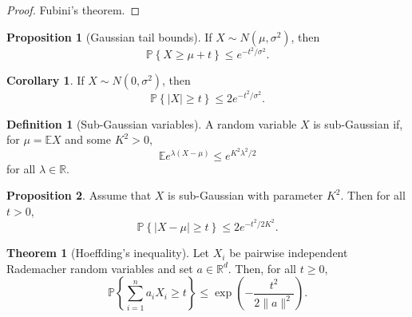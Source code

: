 \documentclass{article}
\theoremstyle{definition}
\newtheorem{theorem}{Theorem}[section]
\newtheorem{definition}{Definition}[section]
\newtheorem{proposition}{Proposition}[section]
\newtheorem{corollary}{Corollary}[section]
\begin{document}
  \begin{proof}
    Fubini's theorem.
  \end{proof}

  \begin{proposition}[Gaussian tail bounds]
    If \( X \sim N(\mu, \sigma^{2}) \), then
    \[
      \mathbb{P}\left\{ X \geq \mu + t \right\} \leq e^{-t^{2} / \sigma^{2}}.
    \]
  \end{proposition}

  \begin{corollary}
    If \( X \sim N(0, \sigma^{2}) \), then
    \[
      \mathbb{P}\left\{ \left| X \right| \geq t \right\} \leq 2
      e^{-t^{2} / \sigma^{2}}.
    \]
  \end{corollary}

  \begin{definition}[Sub-Gaussian variables]
    A random variable \( X \) is sub-Gaussian if, for \( \mu =
    \mathbb{E}X \) and some \( K^{2} > 0 \),
    \[
      \mathbb{E}e^{\lambda(X - \mu)} \leq e^{K^{2} \lambda^{2} / 2}
    \]
    for all \( \lambda \in \mathbb{R} \).
  \end{definition}

  \begin{proposition}
    Assume that \( X \) is sub-Gaussian with parameter \( K^{2}
    \). Then for all \( t > 0 \),
    \[
      \mathbb{P}\left\{ \left| X - \mu \right| \geq t \right\} \leq
      2e^{-t^{2} / 2 K^{2}}.
    \]
  \end{proposition}

  \begin{theorem}[Hoeffding's inequality]
    Let \( X_i \) be pairwise independent Rademacher random variables
    and set \( a \in \mathbb{R}^d \).
    Then, for all \( t \geq 0 \),
    \[
      \mathbb{P}\left\{ \sum_{i=1}^{n} a_i X_i \geq t \right\} \leq
      \exp\left(-\frac{t^2}{2 \|a\|^{2}} \right).
    \]
  \end{theorem}
\end{document}
